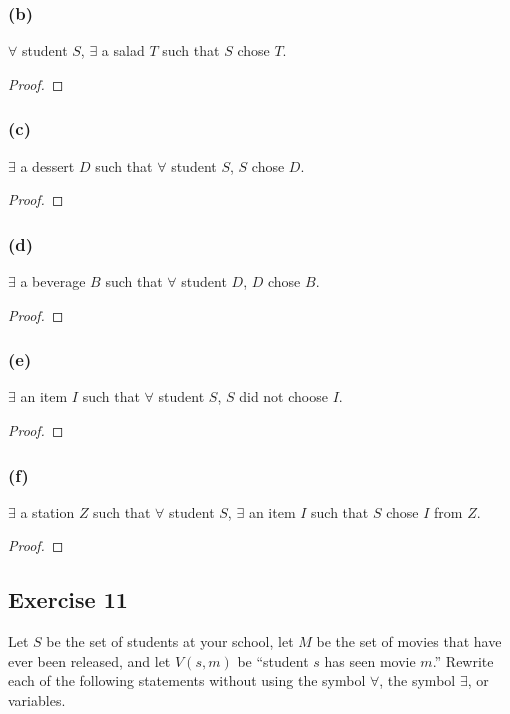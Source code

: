 \documentclass[14pt]{extarticle}
\newcommand{\fa}{\forall}
\newcommand{\te}{\exists}
\begin{document}
\subsubsection{(b)}
$\fa$ student $S$, $\te$ a salad $T$ such that $S$ chose $T$.

\begin{proof}

\end{proof}

\subsubsection{(c)}
$\te$ a dessert $D$ such that $\fa$ student $S$, $S$ chose $D$.

\begin{proof}

\end{proof}

\subsubsection{(d)}
$\te$ a beverage $B$ such that $\fa$ student $D$, $D$ chose $B$.

\begin{proof}

\end{proof}

\subsubsection{(e)}
$\te$ an item $I$ such that $\fa$ student $S$, $S$ did not choose $I$.

\begin{proof}

\end{proof}

\subsubsection{(f)}
$\te$ a station $Z$ such that $\fa$ student $S$, $\te$ an item $I$ such that $S$ chose $I$ from $Z$.

\begin{proof}

\end{proof}

\subsection{Exercise 11}
Let $S$ be the set of students at your school, let $M$ be the set of movies that have ever been released, and let $V(s, m)$ be “student $s$ has seen movie $m$.” Rewrite each of the following statements without using the symbol $\fa$, the symbol $\te$, or variables.
\end{document}
